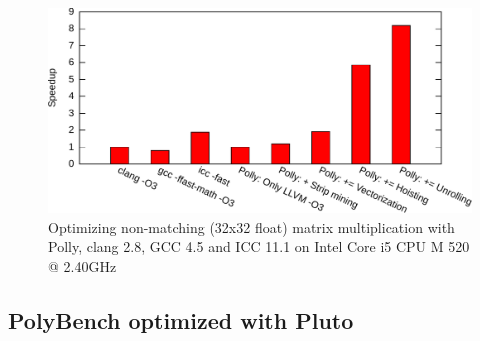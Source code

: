 \documentclass{acm_proc_article-sp}
\begin{document}
\begin{figure}
\includegraphics[width=\columnwidth]{images/matmult-performance}
\caption{Optimizing non-matching (32x32 float) matrix multiplication with Polly, clang 2.8, GCC 4.5 and ICC 11.1 on Intel{\textregistered} Core{\texttrademark} i5 CPU M 520 @ 2.40GHz}
\label{matmul}
\end{figure}

\subsection{PolyBench optimized with Pluto}
\end{document}
